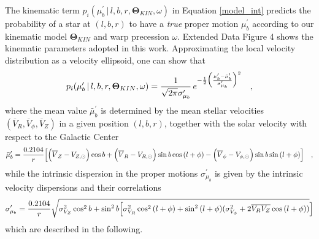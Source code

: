 \documentclass{nature}
\begin{document}
\begin{methods}
The kinematic term $ p_i(\mu^\prime_b \, | \, l, b, r, \boldsymbol{\Theta}_{KIN}, \omega) $ in Equation \ref{model_int} predicts the probability of a star at $(l, b, r)$ to have a \emph{true} proper motion $\mu^\prime_b$ according to our kinematic model $\boldsymbol{\Theta}_{KIN}$ and warp precession $\omega$. Extended Data Figure 4 shows the kinematic parameters adopted in this work. Approximating the local velocity distribution as a velocity ellipsoid, one can show that
\begin {equation}
\label{mub_prob} 
p_i(\mu^\prime_b \, | \, l, b, r, \boldsymbol{\Theta}_{KIN}, \omega) = \frac{1}{\sqrt{2 \pi} \sigma^{\prime}_{\mu_b}} \, e^{- \frac{1}{2} \Bigl( \frac{\mu^\prime_b - \bar{\mu}^{\prime}_{b} }{\sigma^{\prime}_{\mu_b}}  \Bigr)^2 } \quad,
\end{equation}
where the mean value $\bar{\mu}^{\prime}_{b}$ is determined by the mean stellar velocities $(\overline{V}_R, \overline{V}_{\phi}, \overline{V}_{Z})$ in a given position $(l,b,r)$, together with the solar velocity with respect to the Galactic Center
\begin {equation}
\label{mub_th} %
\bar{\mu}^{\prime}_{b} = \frac{0.2104}{ r}  \Bigl[  \Bigl(\overline{V}_Z - V_{Z,\odot} \Bigr) \cos{b} +  \Bigl(\overline{V}_R - V_{R,\odot} \Bigr) \sin{b} \cos{(l + \phi)} -  \Bigl(\overline{V}_{\phi} - V_{\phi,\odot} \Bigr) \sin{b} \sin{(l + \phi)} \Bigr] \quad,
\end{equation}
while the intrinsic dispersion in the proper motions $\sigma^{\prime}_{\mu_b}$ is given by the intrinsic velocity dispersions and their correlations
\begin {equation}
\label{mub_sigma} 
\sigma^{\prime}_{\mu_b} = \frac{0.2104}{ r} \sqrt{ \sigma^2_{V_Z}\cos^2{b} + \sin^2{b} \Bigl[ \sigma^2_{V_R} \cos^2{(l+\phi)} + \sin^2{(l+\phi)} ( \sigma^2_{V_{\phi}}  
         + 2 \overline{V_R V_Z} \cos{(l+\phi)}) } \Bigr]
\end{equation}
which are described in the following.

\end{methods}
\end{document}
